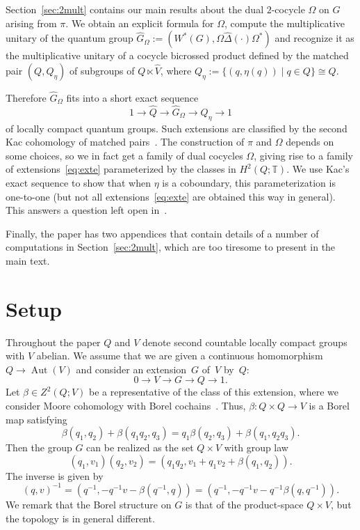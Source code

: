 \documentclass[a4paper,11pt,reqno]{amsart}
\numberwithin{equation}{section}
\theoremstyle{remark}
\theoremstyle{definition}
\newcommand\Dhat{{\hat\Delta}}
\newcommand\Aut{\operatorname{Aut}}
\newcommand\T{{\mathbb T}}
\begin{document}
Section~\ref{sec:2mult} contains our main results about the dual $2$-cocycle $\Omega$ on $G$ arising from $\pi$. We obtain an explicit formula for $\Omega$, compute the multiplicative unitary of the quantum group $\hat G_\Omega:=(W^*(G),\Omega\Dhat(\cdot)\Omega^*)$ and recognize  it as the multiplicative unitary of a cocycle bicrossed product defined by the matched pair $(Q,Q_\eta)$ of subgroups of $Q\ltimes\hat V$, where $Q_\eta:=\{(q,\eta(q))\mid q\in Q\}\cong Q$.

Therefore $\hat G_\Omega$ fits into a short exact sequence
\begin{equation}\label{eq:exte}
1\to\hat Q\to \hat G_\Omega\to Q_\eta\to 1
\end{equation}
of locally compact quantum groups. Such extensions are classified by the second Kac cohomology of matched pairs~\cites{Kac,MR2115374}. The construction of $\pi$ and $\Omega$ depends on some choices, so we in fact get a family of dual cocycles $\Omega$, giving rise to a family of extensions~\eqref{eq:exte} parameterized by the classes in $H^2(Q;\T)$. We use Kac's exact sequence to show that when $\eta$ is a coboundary, this parameterization is one-to-one (but not all extensions~\eqref{eq:exte} are obtained this way in general). This answers a question left open in~\cite{GM}.

Finally, the paper has two appendices that contain details of a number of computations in Section~\ref{sec:2mult}, which are too tiresome to present  in the main text.

\bigskip

\section{Setup}

Throughout the paper $Q$ and $V$ denote second countable locally compact groups
with $V$ abelian. We assume that we are given a continuous homomorphism $Q\to\Aut(V)$ and consider an extension~$G$  of~$V$ by~$Q$:
\begin{equation}\label{eq:extension}
0\to V\to G\to Q\to1.
\end{equation}
Let $\beta\in Z^2(Q;V)$ be a representative of the class of this extension, where we consider Moore cohomology with Borel cochains~\cite{MR0414775}. Thus, $\beta\colon Q\times Q\to V$ is a Borel map satisfying
$$
\beta(q_1,q_2)+\beta(q_1q_2,q_3)=q_1\beta(q_2,q_3)+\beta(q_1,q_2q_3).
$$
Then the group $G$
can be realized  as the set $Q\times V$ with group law
$$
(q_1,v_1)(q_2,v_2)=(q_1q_2,v_1+q_1v_2+\beta(q_1,q_2)).
$$
The inverse is given by
$$
(q,v)^{-1}=(q^{-1},-q^{-1}v-\beta(q^{-1},q))=(q^{-1},-q^{-1}v-q^{-1}\beta(q,q^{-1})).
$$
We remark that the Borel structure on $G$ is that of the product-space $Q\times V$, but the topology is in general different.
\end{document}
